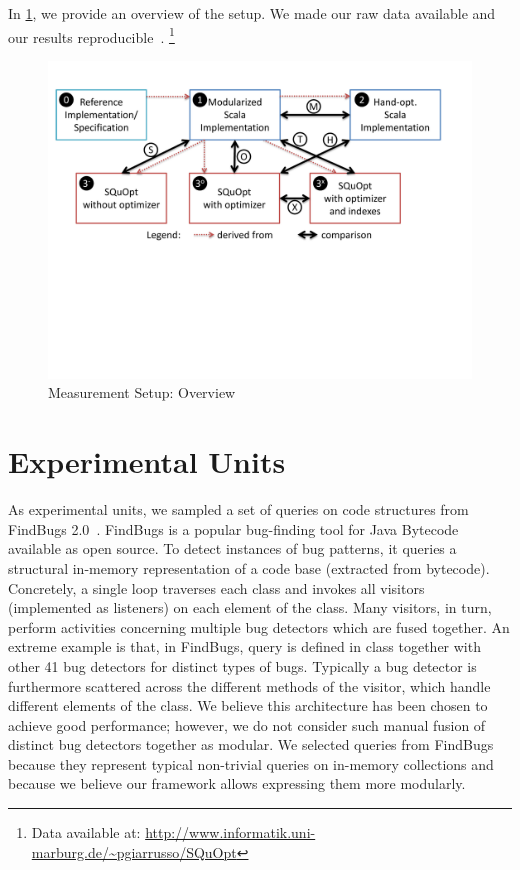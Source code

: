 In \cref{fig:measurements-overview}, we provide an overview of the setup.
	We made our raw data available and our results reproducible~\citep{Vitek11R3}.%
\footnote{Data available at: \url{http://www.informatik.uni-marburg.de/~pgiarrusso/SQuOpt}}

\begin{figure}
	\centering
		\includegraphics[width=\linewidth]{aosd13/graphs/measurements-overview}
	\caption{Measurement Setup: Overview}
	\label{fig:measurements-overview}
\end{figure}


\section{Experimental Units}




As experimental units, we sampled a set of queries on code structures from FindBugs 2.0~\citep{DBLP:journals/sigplan/HovemeyerP04}. FindBugs is a popular bug-finding tool for Java Bytecode available as open source. To detect instances of bug patterns, it queries a structural in-memory representation of a code base (extracted from bytecode).
Concretely, a single loop traverses each class and invokes all visitors (implemented as listeners) on each element of the class. Many visitors, in turn, perform activities concerning multiple bug detectors which are fused together. An extreme example is that, in FindBugs, query \queryRUNFINALIZERSONEXIT{} is defined in class  together with other 41 bug detectors for distinct types of bugs.
Typically a bug detector is furthermore scattered across the different methods of the visitor, which handle different elements of the class.
We believe this architecture has been chosen to achieve good performance; however, we do not consider such manual fusion of distinct bug detectors together as modular. We selected queries from FindBugs because they represent typical non-trivial queries on in-memory collections and because we believe our framework allows expressing them more modularly.

